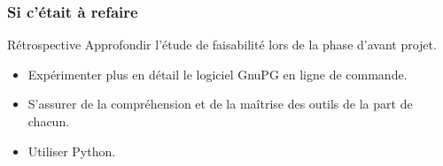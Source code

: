   \begin{frame}
  \frametitle{\color{white}Si c'était à refaire}
    \begin{block}{Rétrospective}
    Approfondir l'étude de faisabilité lors de la phase d'avant projet.
      \begin{itemize}
        \item Expérimenter plus en détail le logiciel GnuPG en ligne de commande.
        \item S'assurer de la compréhension et de la maîtrise des outils de la part de chacun.
        \item Utiliser Python.
      \end{itemize}
    \end{block}


  \end{frame}
